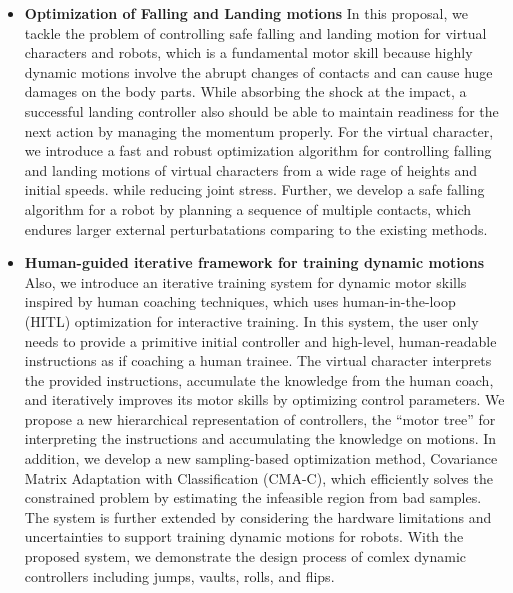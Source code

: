 \begin{itemize}
\item 
  \textbf{Optimization of Falling and Landing motions}
  In this proposal, we tackle the problem of controlling safe falling 
  and landing motion for virtual characters and robots, which is a fundamental
  motor skill because highly dynamic motions involve the abrupt changes
  of contacts and can cause huge damages on the body parts.
  While absorbing the shock at the impact, a successful landing controller 
  also should be able to maintain readiness for the next action by managing
  the momentum properly.
  For the virtual character, we introduce a fast and robust optimization 
  algorithm for controlling falling and landing motions of virtual
  characters from a wide rage of heights and initial speeds.
  while reducing joint stress.
  Further, we develop a safe falling algorithm for a robot by planning a sequence of
  multiple contacts, which endures larger external perturbatations comparing to
  the existing methods.

\item 
  \textbf{Human-guided iterative framework for training dynamic motions}
  Also, we introduce an iterative training system for dynamic motor skills
  inspired by human coaching techniques, which uses human-in-the-loop
  (HITL) optimization for interactive training.
  In this system, the user only needs to provide a primitive initial controller
  and high-level, human-readable instructions as if coaching a human trainee.
  The virtual character interprets the provided instructions,
  accumulate the knowledge from the human coach,
  and iteratively improves its motor skills by optimizing control parameters.
  We propose a new hierarchical representation of controllers, 
  the ``motor tree'' for interpreting the instructions and accumulating
  the knowledge on motions.
  In addition, we develop a new sampling-based optimization method,
  Covariance Matrix Adaptation with Classification (CMA-C), 
  which efficiently solves the constrained problem by estimating
  the infeasible region from bad samples.
  The system is further extended by considering the hardware limitations 
  and uncertainties to support training dynamic motions for robots.
  With the proposed system, we demonstrate the design process of
  comlex dynamic controllers including jumps, vaults, rolls, and flips.



\end{itemize}

